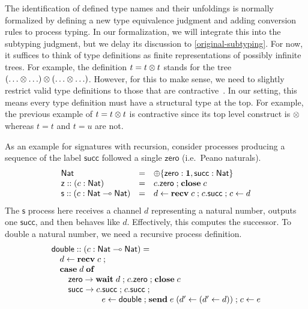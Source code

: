 \documentclass[submission,copyright,creativecommons]{eptcs}
\newcommand{\m}[1]{\mathsf{#1}}
\newcommand{\mb}[1]{\mbox{\bf #1}}
\newcommand{\semi}{\mathrel{;}}
\begin{document}
The identification of defined type names and their unfoldings is normally formalized by defining a new type equivalence judgment and adding conversion rules to process typing. In our formalization, we will integrate this into the subtyping judgment, but we delay its discussion to \cref{original-subtyping}. For now, it suffices to think of type definitions as finite representations of possibly infinite trees. For example, the definition $t = t \otimes t$ stands for the tree $(\ldots \otimes \ldots) \otimes (\ldots \otimes \ldots)$. However, for this to make sense, we need to slightly restrict valid type definitions to those that are contractive~\cite{Stone05un, GayH05}. In our setting, this means every type definition must have a structural type at the top. For example, the previous example of $t = t \otimes t$ is contractive since its top level construct is $\otimes$ whereas $t = t$ and $t = u$ are not.

As an example for signatures with recursion, consider processes producing a sequence of the label $\m{succ}$ followed a single $\m{zero}$ (i.e.\ Peano naturals).
\[
\begin{array}{lcl}
\m{Nat} & = & \oplus\{\m{zero} : \terminate, \m{succ} : \m{Nat}\} \\
\m{z} :: (c:\m{Nat}) & = & c.\m{zero} \semi \mb{close}\; c \\
\m{s} :: (c:\m{Nat} \lolli \m{Nat}) & = & d \leftarrow \mb{recv}\; c \semi c.\m{succ} \semi c \leftarrow d
\end{array}
\]
The $\m{s}$ process here receives a channel $d$ representing a natural number, outputs one $\m{succ}$, and then behaves like $d$.  Effectively, this computes the successor.  To double a natural number, we need a recursive process definition.
\[
\begin{array}{l}
\m{double} :: (c:\m{Nat} \lolli \m{Nat}) = \\
\quad d \leftarrow \mb{recv}\; c \semi \\
\quad \mb{case}\; d\; \mb{of} \\
\quad\quad \m{zero} \rightarrow \mb{wait}\; d \semi c.\m{zero} \semi \mb{close}\; c \\
\quad\quad \m{succ} \rightarrow c.\m{succ} \semi c.\m{succ} \semi \\
\hspace{6em} e \leftarrow \m{double} \semi \mb{send}\; e\; (d' \leftarrow (d' \leftarrow d)) \semi c \leftarrow e
\end{array}
\]
\end{document}

